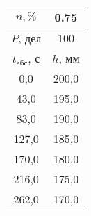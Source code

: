 \begin{tabular}[t]{|c|c|}
\hline
$n, \%$ & 0.75 \\
\hline
$P$, дел & 100 \\
\hline
$t_{абс}$, с & $h$, мм \\ 
\hline
0,0 & 200,0 \\ 
43,0 & 195,0 \\ 
83,0 & 190,0 \\ 
127,0 & 185,0 \\ 
170,0 & 180,0 \\ 
216,0 & 175,0 \\ 
262,0 & 170,0 \\ 
\hline
\end{tabular}